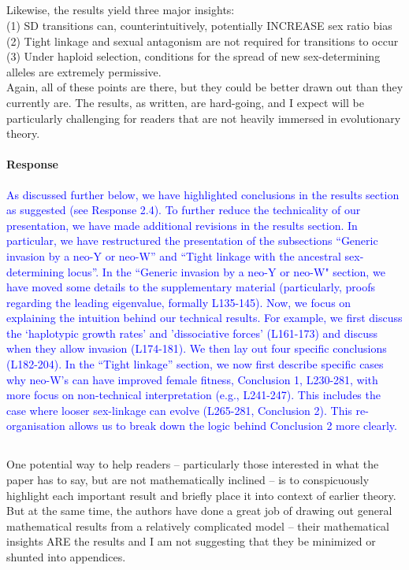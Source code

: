 \documentclass[10pt,letterpaper]{article}
\begin{document}
\noindent\subsection{}
Likewise, the results yield three major insights:\\
(1) SD transitions can, counterintuitively, potentially INCREASE sex ratio bias\\
(2) Tight linkage and sexual antagonism are not required for transitions to occur\\
(3) Under haploid selection, conditions for the spread of new sex-determining alleles are extremely permissive.\\
Again, all of these points are there, but they could be better drawn out than they currently are. The results, as written, are hard-going, and I expect will be particularly challenging for readers that are not heavily immersed in evolutionary theory.

\noindent\paragraph{Response}
\textcolor{blue}{
As discussed further below, we have highlighted conclusions in the results section as suggested (see Response 2.4). 
To further reduce the technicality of our presentation, we have made additional revisions in the results section. 
In particular, we have restructured the presentation of the subsections ``Generic invasion by a neo-Y or neo-W'' and ``Tight linkage with the ancestral sex-determining locus''. 
In the ``Generic invasion by a neo-Y or neo-W" section, we have moved some details to the supplementary material (particularly, proofs regarding the leading eigenvalue, formally L135-145). 
Now, we focus on explaining the intuition behind our technical results.  
For example, we first discuss the `haplotypic growth rates' and 'dissociative forces' (L161-173) and discuss when they allow invasion (L174-181).
We then lay out four specific conclusions (L182-204). 
In the ``Tight linkage'' section, we now first describe specific cases why neo-W's can have improved female fitness, Conclusion 1, L230-281, with more focus on non-technical interpretation (e.g., L241-247). 
This includes the case where looser sex-linkage can evolve (L265-281, Conclusion 2). 
This re-organisation allows us to break down the logic behind Conclusion 2 more clearly. 
}

\noindent\subsection{}
One potential way to help readers -- particularly those interested in what the paper has to say, but are not mathematically inclined -- is to conspicuously highlight each important result and briefly place it into context of earlier theory. But at the same time, the authors have done a great job of drawing out general mathematical results from a relatively complicated model -- their mathematical insights ARE the results and I am not suggesting that they be minimized or shunted into appendices.
\end{document}
